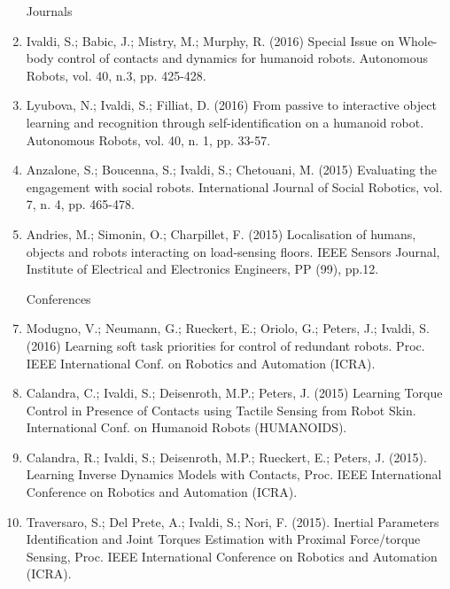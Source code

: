 \begin{enumerate}

\item[Journals]

\item Ivaldi, S.; Babic, J.; Mistry, M.; Murphy, R. (2016) Special Issue on Whole-body control of contacts and dynamics for humanoid robots. Autonomous Robots, vol. 40, n.3, pp. 425-428. 

\item Lyubova, N.; Ivaldi, S.; Filliat, D. (2016) From passive to interactive object learning and recognition through self-identification on a humanoid robot. Autonomous Robots, vol. 40, n. 1, pp. 33-57. 

\item Anzalone, S.; Boucenna, S.; Ivaldi, S.; Chetouani, M. (2015) Evaluating the engagement with social robots. International Journal of Social Robotics, vol. 7, n. 4, pp. 465-478. 

\item Andries, M.;  Simonin, O.;  Charpillet, F. (2015) Localisation of humans, objects and robots interacting on load-sensing floors. IEEE Sensors Journal, Institute of Electrical and Electronics Engineers, PP (99), pp.12.

\item[Conferences]

\item Modugno, V.; Neumann, G.; Rueckert, E.; Oriolo, G.; Peters, J.; Ivaldi, S. (2016) Learning soft task priorities for control of redundant robots. Proc. IEEE International Conf. on Robotics and Automation (ICRA). 

\item Calandra, C.; Ivaldi, S.; Deisenroth, M.P.; Peters, J. (2015) Learning Torque Control in Presence of Contacts using Tactile Sensing from Robot Skin. International Conf. on Humanoid Robots (HUMANOIDS).

\item Calandra, R.; Ivaldi, S.; Deisenroth, M.P.; Rueckert, E.; Peters, J. (2015). Learning Inverse Dynamics Models with Contacts, Proc. IEEE International Conference on Robotics and Automation (ICRA). 

\item Traversaro, S.; Del Prete, A.; Ivaldi, S.; Nori, F. (2015). Inertial Parameters Identification and Joint Torques Estimation with Proximal Force/torque Sensing, Proc. IEEE International Conference on Robotics and Automation (ICRA). 


\end{enumerate}
